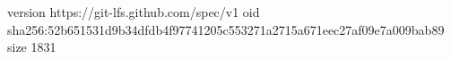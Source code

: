 version https://git-lfs.github.com/spec/v1
oid sha256:52b651531d9b34dfdb4f97741205c553271a2715a671eec27af09e7a009bab89
size 1831
